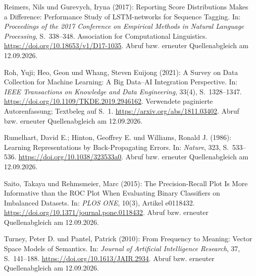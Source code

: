 \par\smallskip
\begin{samepage}
\noindent
Reimers, Nils und Gurevych, Iryna (2017):
Reporting Score Distributions Makes a Difference:
Performance Study of LSTM-networks for Sequence Tagging.
In: \textit{Proceedings of the 2017 Conference on Empirical Methods in Natural Language Processing},
S.~338--348.
Association for Computational Linguistics.
\url{https://doi.org/10.18653/v1/D17-1035}.
Abruf bzw. erneuter Quellenabgleich am 12.09.2026.
\par\end{samepage}
\par\smallskip
\begin{samepage}
\noindent
Roh, Yuji; Heo, Geon und Whang, Steven Euijong (2021):
A Survey on Data Collection for Machine Learning:
A Big Data--AI Integration Perspective.
In: \textit{IEEE Transactions on Knowledge and Data Engineering},
33(4), S.~1328--1347.
\url{https://doi.org/10.1109/TKDE.2019.2946162}.
Verwendete paginierte Autorenfassung; Textbeleg auf S.~1. \url{https://arxiv.org/abs/1811.03402}.
Abruf bzw. erneuter Quellenabgleich am 12.09.2026.
\par\end{samepage}
\par\smallskip
\begin{samepage}
\noindent
Rumelhart, David E.; Hinton, Geoffrey E. und Williams, Ronald J. (1986):
Learning Representations by Back-Propagating Errors.
In: \textit{Nature}, 323, S.~533--536.
\url{https://doi.org/10.1038/323533a0}.
Abruf bzw. erneuter Quellenabgleich am 12.09.2026.
\par\end{samepage}
\par\smallskip
\begin{samepage}
\noindent
Saito, Takaya und Rehmsmeier, Marc (2015):
The Precision-Recall Plot Is More Informative than the ROC Plot
When Evaluating Binary Classifiers on Imbalanced Datasets.
In: \textit{PLOS ONE}, 10(3), Artikel e0118432.
\url{https://doi.org/10.1371/journal.pone.0118432}.
Abruf bzw. erneuter Quellenabgleich am 12.09.2026.
\par\end{samepage}
\par\smallskip
\begin{samepage}
\noindent
Turney, Peter D. und Pantel, Patrick (2010):
From Frequency to Meaning: Vector Space Models of Semantics.
In: \textit{Journal of Artificial Intelligence Research},
37, S.~141--188.
\url{https://doi.org/10.1613/JAIR.2934}.
Abruf bzw. erneuter Quellenabgleich am 12.09.2026.
\par\end{samepage}
